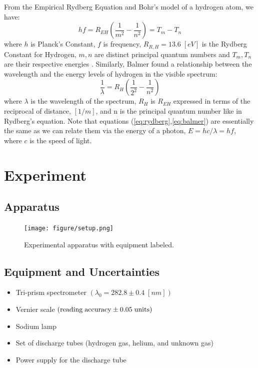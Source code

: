 \documentclass[12pt]{article}
\begin{document}
From the Empirical Rydberg Equation and Bohr's model of a hydrogen atom, we have:
\begin{equation}
    hf=R_{EH}\left(\frac{1}{m^2}-\frac{1}{n^2}\right)=T_m-T_n
    \label{eq:rydberg}
\end{equation}
where $h$ is Planck's Constant, $f$ is frequency, $R_{R,H}=13.6\;[eV]$ is the Rydberg Constant for Hydrogen, $m,n$ are distinct principal quantum numbers and $T_m,T_n$ are their respective energies \autocite{manuall}. Similarly, Balmer found a relationship between the wavelength and the energy levels of hydrogen in the visible spectrum:
\begin{equation}
    \frac{1}{\lambda}=R_H\left(\frac{1}{2^2}-\frac{1}{n^2}\right)
    \label{eq:balmer}
\end{equation}
where $\lambda$ is the wavelength of the spectrum, $R_H$ is $R_{EH}$ expressed in terms of the reciprocal of distance, $[1/m]$, and n is the principal quantum number like in Rydberg's equation. Note that equations (\ref{eq:rydberg},\ref{eq:balmer}) are essentially the same as we can relate them via the energy of a photon, $E=hc/\lambda=hf$, where $c$ is the speed of light. 




\section{Experiment}
\subsection{Apparatus}
\begin{figure}[h!]
    \centering
    \texttt{[image: figure/setup.png]}
    \caption{Experimental apparatus with equipment labeled.}
    \label{fig:0}
\end{figure}
\subsection{Equipment and Uncertainties}
\begin{itemize}
    \item Tri-prism spectrometer $(\lambda_0=282.8\pm0.4\;[nm])$
    \item Vernier scale $({\rm reading\;accuracy}\pm0.05\;{\rm units})$
    \item Sodium lamp
    \item Set of discharge tubes (hydrogen gas, helium, and unknown gas)
    \item Power supply for the discharge tube
\end{itemize}
\end{document}
